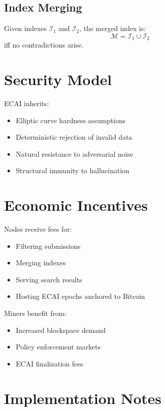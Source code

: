 \documentclass[11pt]{article}
\begin{document}
\subsection{Index Merging}
Given indexes $\mathcal{I}_1$ and $\mathcal{I}_2$, the merged index is:
\[
    \mathcal{M} = \mathcal{I}_1 \cup \mathcal{I}_2
\]
iff no contradictions arise.

\section{Security Model}

ECAI inherits:
\begin{itemize}[noitemsep]
    \item Elliptic curve hardness assumptions
    \item Deterministic rejection of invalid data
    \item Natural resistance to adversarial noise
    \item Structural immunity to hallucination
\end{itemize}

\section{Economic Incentives}

Nodes receive fees for:
\begin{itemize}[noitemsep]
    \item Filtering submissions
    \item Merging indexes
    \item Serving search results
    \item Hosting ECAI epochs anchored to Bitcoin
\end{itemize}

Miners benefit from:
\begin{itemize}[noitemsep]
    \item Increased blockspace demand
    \item Policy enforcement markets
    \item ECAI finalization fees
\end{itemize}

\section{Implementation Notes}
\end{document}
